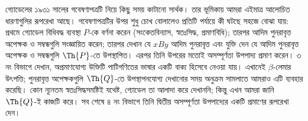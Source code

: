 \documentclass[../../../include/open-logic-section]{subfiles}
\begin{document}


গ্যোডেলের ১৯৩১ সালের গবেষণাপত্রটি নিয়ে কিছু সময় কাটানো সার্থক। তার
ভূমিকায় আমরা এইমাত্র আলোচিত ধারণাগুলির রূপরেখা আছে। গবেষণাপত্রটির উপর
শুধু চোখ বোলালেও প্রতিটি পর্যায়ে কী ঘটছে সহজে বোঝা যায়: প্রথমে গ্যোডেল
বিধিবদ্ধ ব্যবস্থা $P$-কে বর্ণনা করেন (সংকেতবিন্যাস, স্বতঃসিদ্ধ,
প্রমাণবিধি); তারপর আদিম পুনরাবৃত্ত অপেক্ষক ও সম্বন্ধগুলি সংজ্ঞায়িত করেন;
তারপর দেখান যে $x B y$ আদিম পুনরাবৃত্ত এবং যুক্তি দেন যে আদিম পুনরাবৃত্ত
অপেক্ষক ও সম্বন্ধগুলি $\Th{P}$-তে উপস্থাপিত। এরপর তিনি উপরের মতোই
অসম্পূর্ণতা উপপাদ্য প্রমাণ করেন। ৩ নং বিভাগে দেখান, অপ্রমাণযোগ্য উক্তিটি
পাটিগণিতের ভাষার একটি বাক্য হিসেবে নেওয়া যায়। এখানেই $\beta$-লেমার
উৎপত্তি; পুনরাবৃত্ত অপেক্ষকগুলি $\Th{Q}$-তে উপস্থাপনযোগ্য দেখানোর সময়
অনুক্রম সামলাতে আমরাও এটি ব্যবহার করেছি। কোন ন্যূনতম স্বতঃসিদ্ধসমষ্টিই
যথেষ্ট, গ্যোডেল তা আলাদা করে দেখাননি; কিন্তু এখন আমরা জানি $\Th{Q}$-ই
কাজটি করে। সব শেষে ৪ নং বিভাগে তিনি দ্বিতীয় অসম্পূর্ণতা উপপাদ্যের একটি
প্রমাণের রূপরেখা দেন।
\end{document}
